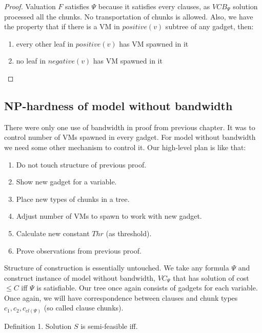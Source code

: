 \begin{proof}
Valuation $F$ satisfies $\Psi$ because it satisfies every clauses, as
$VCB_{\Psi}$ solution processed all the chunks. No transportation of
chunks is allowed. Also, we have the property that if there is a VM in
$positive(v)$ subtree of any gadget, then:

\begin{enumerate}
\item every other leaf in $positive(v)$ has VM spawned in it
\item no leaf in $negative(v)$ has VM spawned in it
\end{enumerate}

\end{proof}

\subsection{NP-hardness of model without bandwidth}

There were only one use of bandwidth in proof from previous
chapter. It was to control number of VMs spawned in every gadget. For
model without bandwidth we need some other mechanism to control
it. Our high-level plan is like that:
\begin{enumerate}
\item Do not touch structure of previous proof.
\item Show new gadget for a variable.
\item Place new types of chunks in a tree.
\item Adjust number of VMs to spawn to work with new gadget.
\item Calculate new constant $Thr$ (as threshold).
\item Prove observations from previous proof. 
\end{enumerate}

Structure of construction is essentially untouched. We take any
formula $\Psi$ and construct instance of model without bandwidth,
$VC_{\Psi}$ that has solution of cost $\leq C$ iff $\Psi$ is
satisfiable. Our tree once again consists of gadgets for each
variable. Once again, we will have correspondence between clauses and
chunk types $c_1, c_2, c_{cl(\Psi)}$ (so called clause chunks). 

Definition 1. Solution $S$ is semi-feasible iff. 

